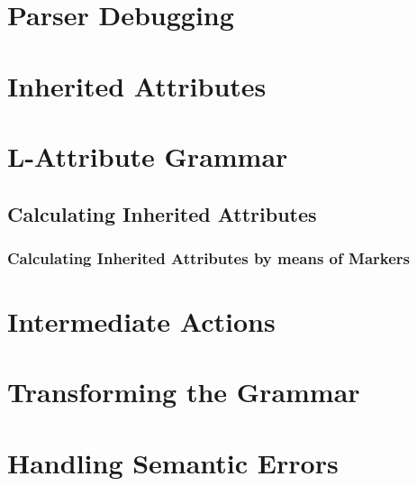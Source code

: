 \section{Parser Debugging}

\section{Inherited Attributes}

\section{L-Attribute Grammar}

\subsection{Calculating Inherited Attributes}

\subsubsection{Calculating Inherited Attributes by means of Markers}

\section{Intermediate Actions}

\section{Transforming the Grammar}

\section{Handling Semantic Errors}